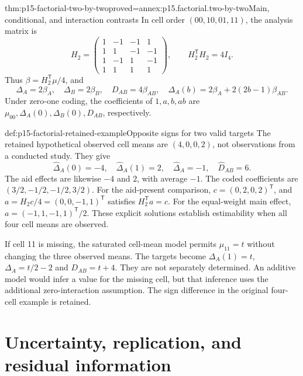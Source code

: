 \begin{hbtheorem}{thm:p15-factorial-two-by-two}{proved=annex:p15.factorial.two-by-two}{Main, conditional, and interaction contrasts}
In cell order \((00,10,01,11)\), the analysis matrix is
\[
 H_2=\begin{pmatrix}
 1&-1&-1&1\\1&1&-1&-1\\1&-1&1&-1\\1&1&1&1
 \end{pmatrix},\qquad H_2^{\mathsf T}H_2=4I_4.
\]
Thus \(\beta=H_2^{\mathsf T}\mu/4\), and
\[
 \Delta_A=2\beta_A,\quad\Delta_B=2\beta_B,\quad
 D_{AB}=4\beta_{AB},\quad
 \Delta_A(b)=2\beta_A+2(2b-1)\beta_{AB}.
\]
Under zero-one coding, the coefficients of \(1,a,b,ab\) are
\(\mu_{00},\Delta_A(0),\Delta_B(0),D_{AB}\), respectively.
\end{hbtheorem}

\begin{hbexample}{def:p15-factorial-retained-example}{Opposite signs for two valid targets}
The retained hypothetical observed cell means are
\((4,0,0,2)\), not observations from a conducted study. They give
\[
 \widehat\Delta_A(0)=-4,\quad \widehat\Delta_A(1)=2,
 \quad\widehat\Delta_A=-1,\quad \widehat D_{AB}=6.
\]
The aid effects are likewise \(-4\) and \(2\), with average \(-1\).
The coded coefficients are \((3/2,-1/2,-1/2,3/2)\).
For the aid-present comparison, \(c=(0,2,0,2)^{\mathsf T}\), and
\(a=H_2c/4=(0,0,-1,1)^{\mathsf T}\) satisfies
\(H_2^{\mathsf T}a=c\). For the equal-weight main effect,
\(a=(-1,1,-1,1)^{\mathsf T}/2\). These explicit solutions establish
estimability when all four cell means are observed.

If cell 11 is missing, the saturated cell-mean model permits
\(\mu_{11}=t\) without changing the three observed means. The targets
become \(\Delta_A(1)=t\), \(\Delta_A=t/2-2\) and \(D_{AB}=t+4\).
They are not separately determined. An additive model would infer a value
for the missing cell, but that inference uses the additional zero-interaction
assumption. The sign difference in the original four-cell example is retained.
\end{hbexample}

\section{Uncertainty, replication, and residual information}
\label{sec:p15-factorial-uncertainty}

